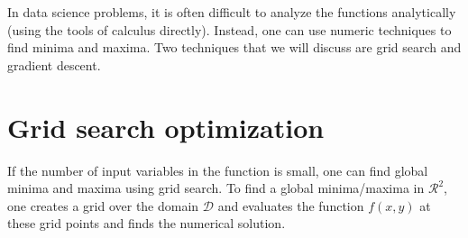 \documentclass[
]{book}
\theoremstyle{definition}
\theoremstyle{definition}
\theoremstyle{definition}
\theoremstyle{definition}
\theoremstyle{remark}
\begin{document}
In data science problems, it is often difficult to analyze the functions analytically (using the tools of calculus directly). Instead, one can use numeric techniques to find minima and maxima. Two techniques that we will discuss are grid search and gradient descent.

\hypertarget{grid-search-optimization}{%
\section{Grid search optimization}\label{grid-search-optimization}}

If the number of input variables in the function is small, one can find global minima and maxima using grid search. To find a global minima/maxima in \(\mathcal{R}^2\), one creates a grid over the domain \(\mathcal{D}\) and evaluates the function \(f(x, y)\) at these grid points and finds the numerical solution.
\end{document}

